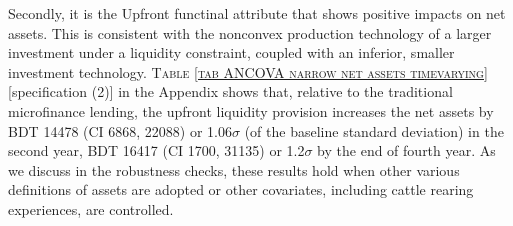 	Secondly, it is the \textsf{Upfront} functinal attribute that shows positive impacts on net assets. %
	This is consistent with the nonconvex production technology of a larger investment under a liquidity constraint, coupled with an inferior, smaller investment technology. \textsc{\normalsize Table \ref{tab ANCOVA narrow net assets timevarying}} [specification (2)] in the Appendix shows that, relative to the traditional microfinance lending, the upfront liquidity provision increases the net assets by BDT 
	14478 
	(CI 6868, 22088) or 1.06$\sigma$ (of the baseline standard deviation) in the second year, 
	BDT 16417 
	(CI 1700, 31135) or 1.2$\sigma$ by the end of fourth year. 
	As we discuss in the robustness checks, these results hold when other various definitions of assets are adopted or other covariates, including cattle rearing experiences, are controlled.

